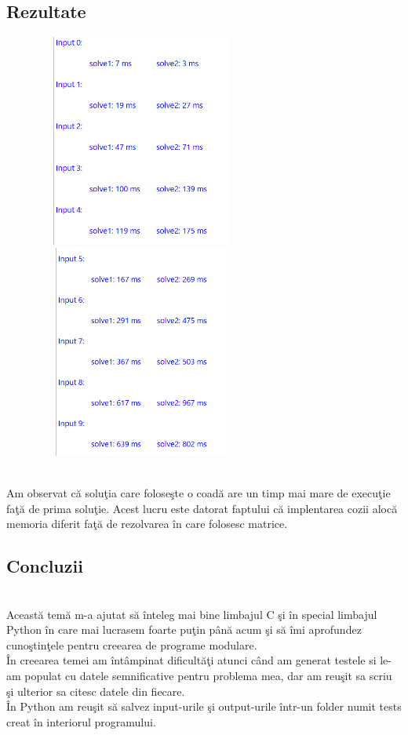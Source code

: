 \documentclass{article}
\begin{document}
\subsection{Rezultate}
\begin{figure}[h]
\includegraphics[width=7cm,height=7cm]{py1}
\includegraphics[width=7cm,height=7cm]{py2}
\end{figure}
\\Am observat c\u{a} solu\c{t}ia care folose\c{s}te o coad\u{a} are un timp mai mare de execu\c{t}ie fa\c{t}\u{a} de prima solu\c{t}ie. Acest lucru este datorat faptului c\u{a} implentarea cozii aloc\u{a} memoria diferit fa\c{t}\u{a} de rezolvarea \^{i}n care folosesc matrice.
\subsection{Concluzii}
\\ Aceast\u{a} tem\u{a} m-a ajutat s\u{a} \^{i}nteleg mai bine limbajul C \c{s}i \^{i}n special limbajul Python \^{i}n care mai lucrasem foarte pu\c{t}in p\^{a}n\u{a} acum  \c{s}i s\u{a} \^{i}mi aprofundez cuno\c{s}tin\c{t}ele pentru creearea de programe modulare.
\\ \^{I}n creearea temei am \^{i}nt\^{a}mpinat dificult\u{a}\c{t}i atunci c\^{a}nd am generat testele si le-am populat cu datele semnificative pentru problema mea, dar am reu\c{s}it sa scriu \c{s}i ulterior sa citesc datele din fiecare.
\\\^{I}n Python am reu\c{s}it s\u{a} salvez input-urile \c{s}i output-urile \^{i}ntr-un folder numit tests creat \^{i}n interiorul programului.
   
\end{document}
